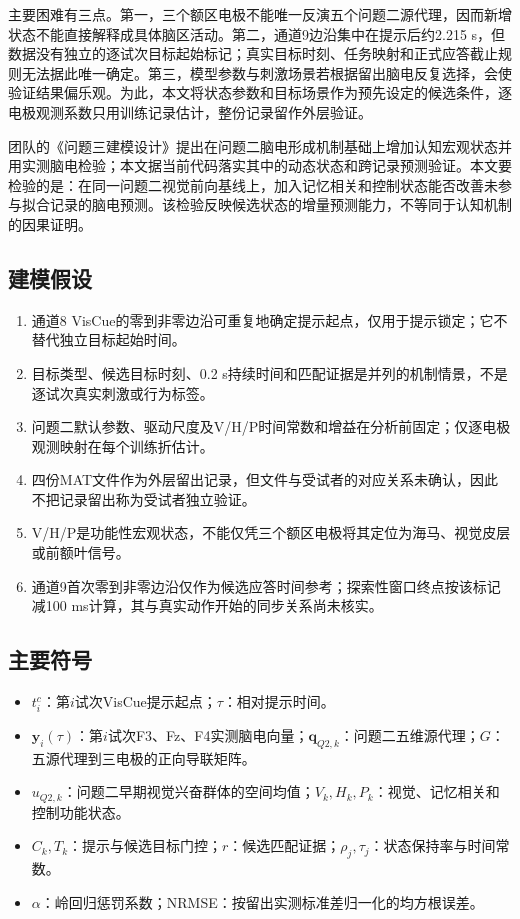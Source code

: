 \documentclass[UTF8,12pt,a4paper,fontset=windows]{ctexart}
\providecommand{\tightlist}{%
  \setlength{\itemsep}{0pt}\setlength{\parskip}{0pt}}
\begin{document}
主要困难有三点。第一，三个额区电极不能唯一反演五个问题二源代理，因而新增状态不能直接解释成具体脑区活动。第二，通道9边沿集中在提示后约2.215 s，但数据没有独立的逐试次目标起始标记；真实目标时刻、任务映射和正式应答截止规则无法据此唯一确定。第三，模型参数与刺激场景若根据留出脑电反复选择，会使验证结果偏乐观。为此，本文将状态参数和目标场景作为预先设定的候选条件，逐电极观测系数只用训练记录估计，整份记录留作外层验证。

团队的《问题三建模设计》提出在问题二脑电形成机制基础上增加认知宏观状态并用实测脑电检验\cite{designQ3}；本文据当前代码落实其中的动态状态和跨记录预测验证。本文要检验的是：在同一问题二视觉前向基线上，加入记忆相关和控制状态能否改善未参与拟合记录的脑电预测。该检验反映候选状态的增量预测能力，不等同于认知机制的因果证明。

\hypertarget{ux5efaux6a21ux5047ux8bbe}{%
\subsection{建模假设}\label{ux5efaux6a21ux5047ux8bbe}}

\begin{enumerate}
\def\labelenumi{\arabic{enumi}.}
\tightlist
\item
  通道8 VisCue的零到非零边沿可重复地确定提示起点，仅用于提示锁定；它不替代独立目标起始时间。
\item
  目标类型、候选目标时刻、0.2 s持续时间和匹配证据是并列的机制情景，不是逐试次真实刺激或行为标签。
\item
  问题二默认参数、驱动尺度及V/H/P时间常数和增益在分析前固定；仅逐电极观测映射在每个训练折估计。
\item
  四份MAT文件作为外层留出记录，但文件与受试者的对应关系未确认，因此不把记录留出称为受试者独立验证。
\item
  V/H/P是功能性宏观状态，不能仅凭三个额区电极将其定位为海马、视觉皮层或前额叶信号。
\item
  通道9首次零到非零边沿仅作为候选应答时间参考；探索性窗口终点按该标记减100 ms计算，其与真实动作开始的同步关系尚未核实。
\end{enumerate}

\hypertarget{ux4e3bux8981ux7b26ux53f7}{%
\subsection{主要符号}\label{ux4e3bux8981ux7b26ux53f7}}

\begin{itemize}
\tightlist
\item
  \(t_i^c\)：第\(i\)试次VisCue提示起点；\(\tau\)：相对提示时间。
\item
  \(\mathbf y_i(\tau)\)：第\(i\)试次F3、Fz、F4实测脑电向量；\(\mathbf q_{Q2,k}\)：问题二五维源代理；\(G\)：五源代理到三电极的正向导联矩阵。
\item
  \(u_{Q2,k}\)：问题二早期视觉兴奋群体的空间均值；\(V_k,H_k,P_k\)：视觉、记忆相关和控制功能状态。
\item
  \(C_k,T_k\)：提示与候选目标门控；\(r\)：候选匹配证据；\(\rho_j,\tau_j\)：状态保持率与时间常数。
\item
  \(\alpha\)：岭回归惩罚系数；NRMSE：按留出实测标准差归一化的均方根误差。
\end{itemize}
\end{document}
